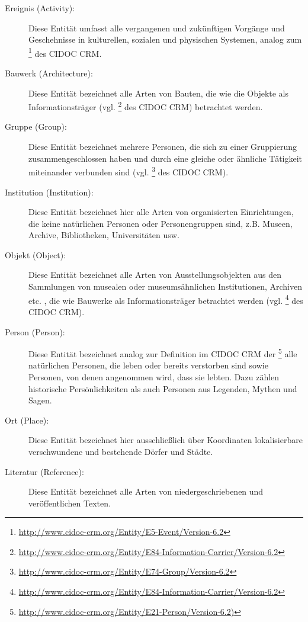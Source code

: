 \begin{description}
	\item[Ereignis (Activity):] Diese Entität umfasst alle vergangenen und zukünftigen Vorgänge und Geschehnisse in kulturellen, sozialen und physischen Systemen, analog zum \texttt{}\footnote{\url{http://www.cidoc-crm.org/Entity/E5-Event/Version-6.2}} des CIDOC CRM.
	\item[Bauwerk (Architecture):] Diese Entität bezeichnet alle Arten von Bauten, die wie die Objekte als Informationsträger (vgl. \texttt{}\footnote{\url{http://www.cidoc-crm.org/Entity/E84-Information-Carrier/Version-6.2}} des CIDOC CRM) betrachtet werden.
	\item[Gruppe (Group):] Diese Entität bezeichnet mehrere Personen, die sich zu einer Gruppierung zusammengeschlossen haben und durch eine gleiche oder ähnliche Tätigkeit miteinander verbunden sind (vgl. \texttt{}\footnote{\url{http://www.cidoc-crm.org/Entity/E74-Group/Version-6.2}} des CIDOC CRM).
	\item[Institution (Institution):] Diese Entität bezeichnet hier alle Arten von organisierten Einrichtungen, die keine natürlichen Personen oder Personengruppen sind, z.B. Museen, Archive, Bibliotheken, Universitäten usw.
	\item[Objekt (Object):] Diese Entität bezeichnet alle Arten von Ausstellungsobjekten aus den Sammlungen von musealen oder museumsähnlichen Institutionen, Archiven etc. , die wie Bauwerke als Informationsträger betrachtet werden (vgl. \texttt{}\footnote{\url{http://www.cidoc-crm.org/Entity/E84-Information-Carrier/Version-6.2}} des CIDOC CRM).
	\item[Person (Person):] Diese Entität bezeichnet analog zur Definition im CIDOC CRM der \texttt{}\footnote{\url{http://www.cidoc-crm.org/Entity/E21-Person/Version-6.2)}} alle natürlichen Personen, die leben oder bereits verstorben sind sowie Personen, von denen angenommen wird, dass sie lebten. Dazu zählen historische Persönlichkeiten als auch Personen aus Legenden, Mythen und Sagen.
	\item[Ort (Place):] Diese Entität bezeichnet hier ausschließlich über Koordinaten lokalisierbare verschwundene und bestehende Dörfer und Städte.
	\item[Literatur (Reference):] Diese Entität bezeichnet alle Arten von niedergeschriebenen und veröffentlichen Texten.
\end{description}

